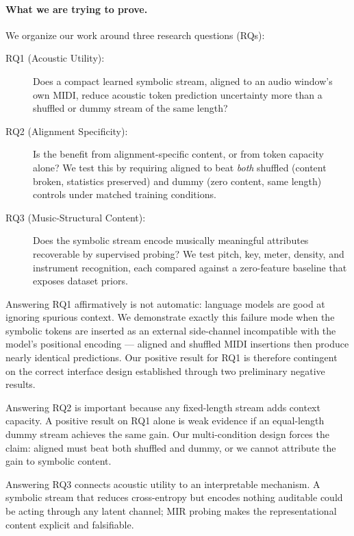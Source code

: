 \documentclass[11pt]{article}
\begin{document}
\paragraph{What we are trying to prove.}
We organize our work around three research questions (RQs):

\begin{description}
  \item[RQ1 (Acoustic Utility):] Does a compact learned symbolic stream, aligned to
    an audio window's own MIDI, reduce acoustic token prediction uncertainty more than
    a shuffled or dummy stream of the same length?
  \item[RQ2 (Alignment Specificity):] Is the benefit from alignment-specific content,
    or from token capacity alone?  We test this by requiring aligned to beat
    \emph{both} shuffled (content broken, statistics preserved) and dummy (zero content,
    same length) controls under matched training conditions.
  \item[RQ3 (Music-Structural Content):] Does the symbolic stream encode
    musically meaningful attributes recoverable by supervised probing?
    We test pitch, key, meter, density, and instrument recognition, each compared
    against a zero-feature baseline that exposes dataset priors.
\end{description}

Answering RQ1 affirmatively is not automatic: language models are good at ignoring
spurious context.  We demonstrate exactly this failure mode when the symbolic tokens
are inserted as an external side-channel incompatible with the model's positional
encoding --- aligned and shuffled MIDI insertions then produce nearly identical predictions.
Our positive result for RQ1 is therefore contingent on the correct interface design
established through two preliminary negative results.

Answering RQ2 is important because any fixed-length stream adds context capacity.
A positive result on RQ1 alone is weak evidence if an equal-length dummy stream achieves
the same gain.  Our multi-condition design forces the claim: aligned must beat both
shuffled and dummy, or we cannot attribute the gain to symbolic content.

Answering RQ3 connects acoustic utility to an interpretable mechanism.  A symbolic stream
that reduces cross-entropy but encodes nothing auditable could be acting through any
latent channel; MIR probing makes the representational content explicit and falsifiable.
\end{document}
